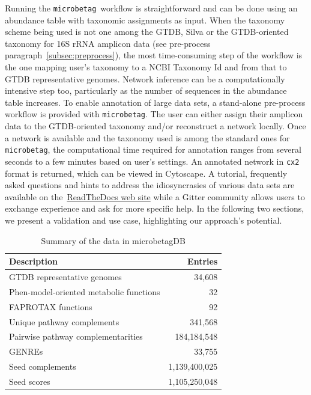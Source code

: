 \documentclass[sn-mathphys,Numbered]{sn-jnl}  %
\theoremstyle{thmstyleone}%
\theoremstyle{thmstyletwo}%
\theoremstyle{thmstylethree}%
\newcommand{\microbetag}{\texttt{microbetag}}
\begin{document}
        Running the \microbetag~\space workflow is straightforward and can be done using an abundance table with taxonomic assignments as input.
        When the taxonomy scheme being used is not one among the GTDB, Silva or the GTDB-oriented taxonomy for 16S rRNA amplicon data (see pre-process paragraph~\ref{subsec:preprocess}), the most time-consuming step of the workflow is the one mapping user's taxonomy to a NCBI Taxonomy Id and from that to GTDB representative genomes. 
        Network inference can be a computationally intensive step too, particularly as the number of sequences in the abundance table increases. 
        To enable annotation of large data sets, a stand-alone pre-process workflow is provided with \microbetag.
        The user can either assign their amplicon data to the GTDB-oriented taxonomy and/or reconstruct a network locally. 
        Once a network is available and the taxonomy used is among the standard ones for \microbetag, the computational time required for annotation ranges from several seconds to a few minutes based on user's settings.
        An annotated network in \texttt{cx2} format is returned, which can be viewed in Cytoscape.
        A tutorial, frequently asked questions and hints to address the idiosyncrasies of various data sets are available on the~\href{https://hariszaf.github.io/microbetag/}{ReadTheDocs web site} while a Gitter community allows users to exchange experience and ask for more specific help.
        In the following two sections, we present a validation and use case, highlighting our approach's potential.

        \begin{table}[h!]
            \caption[Summary of Data]{
                Summary of the data in microbetagDB
            }
            \label{tab:db}
            \begin{tabular}{lr}
                \toprule
                Description & Entries \\
                \midrule
                GTDB representative genomes & 34,608 \\
                Phen-model-oriented metabolic functions & 32 \\
                FAPROTAX functions & 92 \\
                Unique pathway complements & 341,568 \\
                Pairwise pathway complementarities & 184,184,548\\
                GENREs & 33,755 \\
                Seed complements & 1,139,400,025\\
                Seed scores & 1,105,250,048 \\
                \bottomrule
            \end{tabular}
        \end{table}
\end{document}
